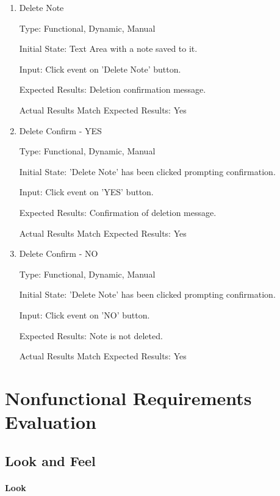 \documentclass[12pt, titlepage]{article}
\begin{document}
\begin{enumerate}
	
	\item{Delete Note\\}
	
	Type: Functional, Dynamic, Manual
	
	Initial State: Text Area with a note saved to it. 
	
	Input: Click event on 'Delete Note' button.
	
	Expected Results: Deletion confirmation message. 
	
	Actual Results Match Expected Results: Yes
	
	\item{Delete Confirm - YES\\}
	
	Type: Functional, Dynamic, Manual
	
	Initial State: 'Delete Note' has been clicked prompting confirmation. 
	
	Input: Click event on 'YES' button.
	
	Expected Results: Confirmation of deletion message. 
	
	Actual Results Match Expected Results: Yes
	
	\item{Delete Confirm - NO\\}
	
	Type: Functional, Dynamic, Manual
	
	Initial State: 'Delete Note' has been clicked prompting confirmation. 
	
	Input: Click event on 'NO' button.
	
	Expected Results: Note is not deleted. 
	
	Actual Results Match Expected Results: Yes	
	
\end{enumerate}
\section{Nonfunctional Requirements Evaluation}

\subsection{Look and Feel}

\paragraph{Look}
\end{document}
